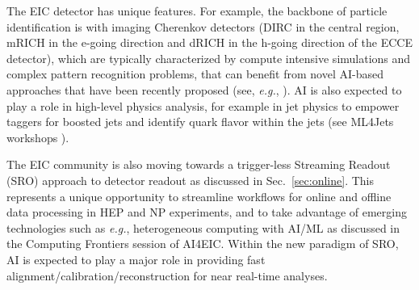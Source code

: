 
The EIC detector has unique features. For example, the backbone of particle identification is with imaging Cherenkov detectors \cite{he2020rich} (DIRC in the central region, mRICH in the e-going direction and dRICH in the h-going direction of the ECCE detector), which are typically characterized by compute intensive simulations and complex pattern recognition problems, that can benefit from novel AI-based approaches that have been recently proposed (see, \textit{e.g.}, \cite{fanelli2020deeprich}). %
%
%
%
 AI is also expected to play a role in high-level physics analysis, for example in jet physics to empower taggers for boosted jets and identify quark flavor within the jets (see ML4Jets workshops \cite{ml4jets}).    


The EIC community is also moving towards a trigger-less Streaming Readout (SRO) approach to detector readout as discussed in Sec.~\ref{sec:online}. 
This represents a unique opportunity to streamline workflows for online and offline data processing in HEP and NP experiments, and to take advantage of emerging technologies such as \textit{e.g.}, heterogeneous computing with AI/ML as discussed in the Computing Frontiers session of AI4EIC.
Within the new paradigm of SRO, AI is expected to play a major role in providing fast alignment/calibration/reconstruction for near real-time analyses.









